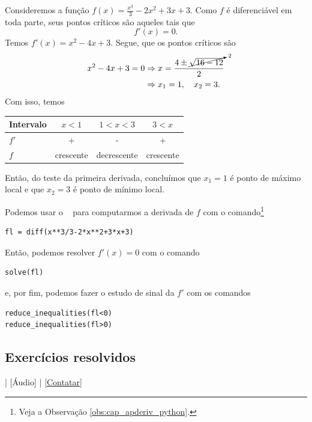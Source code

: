\begin{ex}
  Consideremos a função $\displaystyle f(x)=\frac{x^3}{3}-2x^2+3x+3$. Como $f$ é diferenciável em toda parte, seus pontos críticos são aqueles tais que
  \begin{equation}
    f'(x)=0.
  \end{equation}
  Temos $f'(x) = x^2 - 4x + 3$. Segue, que os pontos críticos são
  \begin{align}
    x^2-4x+3=0 &\Rightarrow x = \frac{4\pm \cancelto{2}{\sqrt{16-12}}}{2} \\
    &\Rightarrow x_1 = 1,\quad x_2=3.
  \end{align}
  Com isso, temos
  \begin{center}
  \begin{tabular}{lccc}\hline
    Intervalo & $x<1$ & $1<x<3$ & $3<x$ \\\hline
    $f'$ & + & - & + \\
    $f$ & crescente & decrescente & crescente\\\hline
  \end{tabular}
\end{center}
  Então, do teste da primeira derivada, concluímos que $x_1=1$ é ponto de máximo local e que $x_2=3$ é ponto de mínimo local.

  \ifispython
  Podemos usar o \sympy~ para computarmos a derivada de $f$ com o comando\footnote{Veja a Observação \ref{obs:cap_apderiv_python}.}
\begin{verbatim}
fl = diff(x**3/3-2*x**2+3*x+3)
\end{verbatim}
  Então, podemos resolver $f'(x)=0$ com o comando
\begin{verbatim}
solve(fl)
\end{verbatim}
  e, por fim, podemos fazer o estudo de sinal da $f'$ com os comandos
\begin{verbatim}
reduce_inequalities(fl<0)
reduce_inequalities(fl>0)
\end{verbatim}
  \fi
\end{ex}

\subsection*{Exercícios resolvidos}

\begin{flushright}
  [Vídeo] | [Áudio] | \href{https://phkonzen.github.io/notas/contato.html}{[Contatar]}
\end{flushright}

